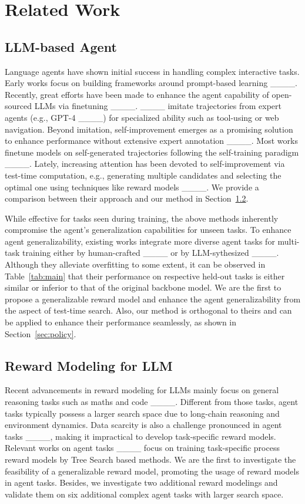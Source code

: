 \section{Related Work}
\subsection{LLM-based Agent}
Language agents have shown initial success in handling complex interactive tasks.
Early works focus on building frameworks around prompt-based learning ____.
Recently, great efforts have been made to enhance the agent capability of open-sourced LLMs via finetuning ____.
____ imitate trajectories from expert agents (e.g., GPT-4 ____) for specialized ability such as tool-using or web navigation.
Beyond imitation, self-improvement emerges as a promising solution to enhance performance without extensive expert annotation ____. 
Most works finetune models on self-generated trajectories following the self-training paradigm ____.
Lately, increasing attention has been devoted to self-improvement via test-time computation, e.g., generating multiple candidates and selecting the optimal one using techniques like reward models ____.
We provide a comparison between their approach and our method in Section~\ref{sec:rmforllm}.

While effective for tasks seen during training, the above methods inherently compromise the agent's generalization capabilities for unseen tasks.
To enhance agent generalizability, existing works integrate more diverse agent tasks for multi-task training either by human-crafted ____ or by LLM-sythesized ____.
Although they alleviate overfitting to some extent, it can be observed in Table~\ref{tab:main} that their performance on respective held-out tasks is either similar or inferior to that of the original backbone model.
We are the first to propose a generalizable reward model and enhance the agent generalizability from the aspect of test-time search.
Also, our method is orthogonal to theirs and can be applied to enhance their performance seamlessly, as shown in Section~\ref{sec:policy}.

\subsection{Reward Modeling for LLM}
\label{sec:rmforllm}
Recent advancements in reward modeling for LLMs mainly focus on general reasoning tasks such as maths and code ____.
Different from those tasks, agent tasks typically possess a larger search space due to long-chain reasoning and environment dynamics.
Data scarcity is also a challenge pronounced in agent tasks ____, making it impractical to develop task-specific reward models.
Relevant works on agent tasks ____ focus on training task-specific process reward models by Tree Search based methods.
We are the first to investigate the feasibility of a generalizable reward model, promoting the usage of reward models in agent tasks.
Besides, we investigate two additional reward modelings and validate them on six additional complex agent tasks with larger search space.